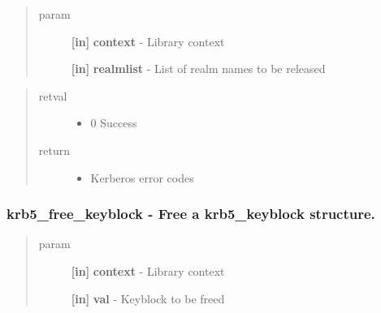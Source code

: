 \documentclass[letterpaper,10pt,english]{sphinxmanual}
\begin{document}
\begin{quote}\begin{description}
\item[{param}] \leavevmode
\textbf{{[}in{]}} \textbf{context} - Library context

\textbf{{[}in{]}} \textbf{realmlist} - List of realm names to be released

\end{description}\end{quote}
\begin{quote}\begin{description}
\item[{retval}] \leavevmode\begin{itemize}
\item {} 
0   Success

\end{itemize}

\item[{return}] \leavevmode\begin{itemize}
\item {} 
Kerberos error codes

\end{itemize}

\end{description}\end{quote}


\subsubsection{krb5\_free\_keyblock -  Free a krb5\_keyblock structure.}
\label{appdev/refs/api/krb5_free_keyblock:krb5-free-keyblock-free-a-krb5-keyblock-structure}\label{appdev/refs/api/krb5_free_keyblock::doc}

\begin{fulllineitems}
\label{appdev/refs/api/krb5_free_keyblock:c.krb5_free_keyblock}
\end{fulllineitems}

\begin{quote}\begin{description}
\item[{param}] \leavevmode
\textbf{{[}in{]}} \textbf{context} - Library context

\textbf{{[}in{]}} \textbf{val} - Keyblock to be freed

\end{description}\end{quote}
\end{document}

